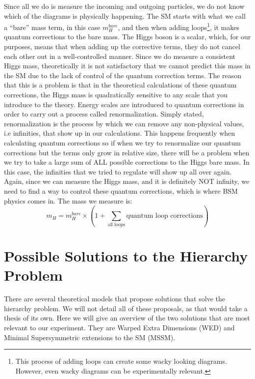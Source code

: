 Since all we do is measure the incoming and outgoing particles, we do not know which of the diagrams is physically happening. 
The SM starts with what we call a ``bare'' mass term, in this case $m_H^{bare}$, and then when adding loops\footnote{This process of adding loops can create some wacky looking diagrams. However, even wacky diagrams can be experimentally relevant.}, it makes quantum corrections to the bare mass.
The Higgs boson is a scalar, which, for our purposes, means that when adding up the corrective terms, they do not cancel each other out in a well-controlled manner.
Since we do measure a consistent Higgs mass, theoretically it is not satisfactory that we cannot predict this mass in the SM due to the lack of control of the quantum correction terms.
The reason that this is a problem is that in the theoretical calculations of these quantum corrections, the Higgs mass is quadratically sensitive to any scale that you introduce to the theory.
Energy scales are introduced to quantum corrections in order to carry out a process called renormalization. Simply stated, renormalization is the process by which we can remove any non-physical values, i.e infinities, that show up in our calculations.
This happens frequently when calculating quantum corrections so if when we try to renormalize our quantum corrections but the terms only grow in relative size, there will be a problem when we try to take a large sum of ALL possible corrections to the Higgs bare mass.
In this case, the infinities that we tried to regulate will show up all over again. Again, since we can measure the Higgs mass, and it is definitely NOT infinity, we need to find a way to control these quantum corrections, which is where BSM physics comes in.
The mass we measure is:
\begin{equation}
    m_H = m_H^{bare} \times ( 1 + \sum_{\text{all loops}} \text{quantum loop corrections} ) 
    \label{eq:eq_bareMH}
\end{equation}

\section{Possible Solutions to the Hierarchy Problem}

There are several theoretical models that propose solutions that solve the hierarchy problem. We will not detail all of these proposals, as that would take a thesis of its own. 
Here we will give an overview of the two solutions that are most relevant to our experiment. They are Warped Extra Dimensions (WED) and Minimal Supersymmetric extensions to the SM (MSSM).

